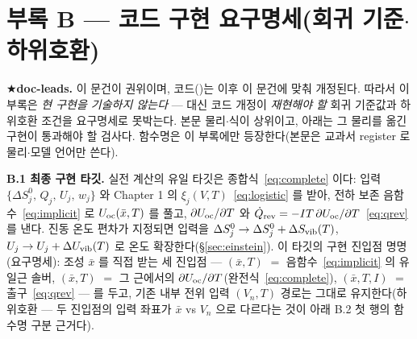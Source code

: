 \section*{부록 B --- 코드 구현 요구명세(회귀 기준$\cdot$하위호환)}

★\textbf{doc-leads.} 이 문건이 권위이며, 코드()는 이후 이 문건에 맞춰 개정된다. 따라서 이
부록은 \emph{현 구현을 기술하지 않는다} --- 대신 코드 개정이 \emph{재현해야 할} 회귀 기준값과 하위호환 조건을
요구명세로 못박는다. 본문 물리$\cdot$식이 상위이고, 아래는 그 물리를 옮긴 구현이 통과해야 할 검사다. 함수명은
이 부록에만 등장한다(본문은 교과서 register 로 물리$\cdot$모델 언어만 쓴다).

\textbf{B.1 최종 구현 타깃.} 실전 계산의 유일 타깃은 종합식~\eqref{eq:complete} 이다: 입력
$\{\Delta S^0_j,\,Q_j,\,U_j,\,w_j\}$ 와 Chapter 1 의 $\xi_j(V,T)$~\eqref{eq:logistic} 를 받아, 전하 보존
음함수~\eqref{eq:implicit} 로 $U_{\mathrm{oc}}(\bar x,T)$ 를 풀고, $\partial U_{\mathrm{oc}}/\partial T$ 와 $\dot Q_{\mathrm{rev}}=-IT\,\partial
U_{\mathrm{oc}}/\partial T$~\eqref{eq:qrev} 를 낸다. 진동 온도 편차가 지정되면 입력을 $\Delta S^0_j\to\Delta
S^0_j+\Delta S_{\mathrm{vib}}(T)$, $U_j\to U_j+\Delta U_{\mathrm{vib}}(T)$ 로 온도 확장한다(\S\ref{sec:einstein}).
이 타깃의 구현 진입점 명명(요구명세): 조성 $\bar x$ 를 직접 받는 세 진입점 ---
$(\bar x,T)$ $=$ 음함수~\eqref{eq:implicit} 의 유일근 솔버,
$(\bar x,T)$ $=$ 그 근에서의 $\partial U_{\mathrm{oc}}/\partial T$(완전식~\eqref{eq:complete}),
$(\bar x,T,I)$ $=$ 출구~\eqref{eq:qrev} --- 를 두고, 기존 내부 전위 입력
$(V_n,T)$ 경로는 그대로 유지한다(하위호환 --- 두 진입점의 입력 좌표가
$\bar x$ vs $V_n$ 으로 다르다는 것이 아래 B.2 첫 행의 함수명 구분 근거다).

